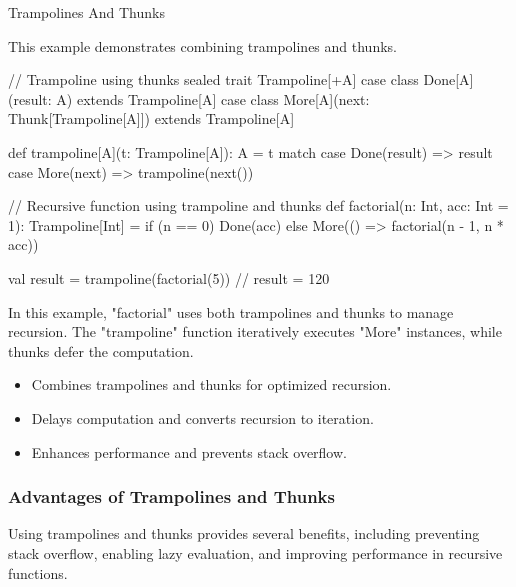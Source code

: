 \begin{notes}{Trampolines And Thunks}
    \begin{highlight}
    
        This example demonstrates combining trampolines and thunks.
    
    \begin{code}[Scala]
    // Trampoline using thunks
    sealed trait Trampoline[+A]
    case class Done[A](result: A) extends Trampoline[A]
    case class More[A](next: Thunk[Trampoline[A]]) extends Trampoline[A]
    
    def trampoline[A](t: Trampoline[A]): A = t match {
        case Done(result) => result
        case More(next) => trampoline(next())
    }
    
    // Recursive function using trampoline and thunks
    def factorial(n: Int, acc: Int = 1): Trampoline[Int] =
        if (n == 0) Done(acc)
        else More(() => factorial(n - 1, n * acc))
    
    val result = trampoline(factorial(5))  // result = 120
    \end{code}
    
        In this example, "factorial" uses both trampolines and thunks to manage recursion. The "trampoline" function iteratively executes "More" instances, while thunks defer the computation.
    
        \begin{itemize}
            \item Combines trampolines and thunks for optimized recursion.
            \item Delays computation and converts recursion to iteration.
            \item Enhances performance and prevents stack overflow.
        \end{itemize}
    
    \end{highlight}
    
    \subsubsection*{Advantages of Trampolines and Thunks}
    
    Using trampolines and thunks provides several benefits, including preventing stack overflow, enabling lazy evaluation, and improving performance in recursive functions.
    
    \begin{highlight}
    

\end{highlight}
\end{notes}
